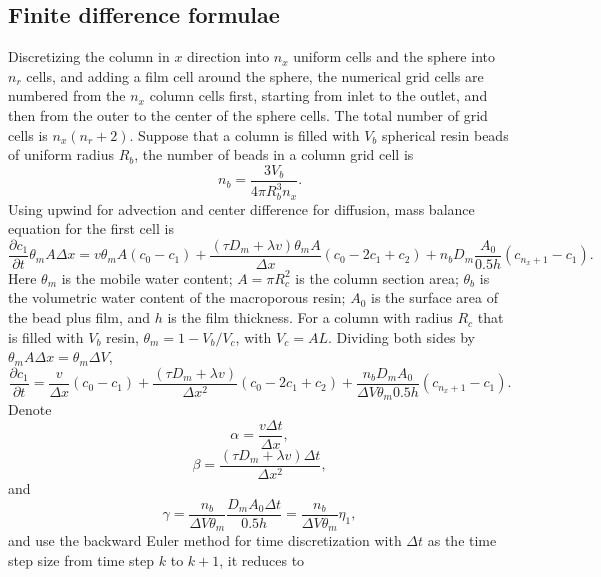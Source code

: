 \documentclass{article}
\begin{document}
\subsection{Finite difference formulae}
Discretizing the column in $x$ direction into $n_x$ uniform cells and the sphere into $n_r$  cells, and adding a film cell around the sphere, the numerical grid cells are numbered from the $n_x$ column cells first, starting from inlet to the outlet, and then from the outer to the center of the sphere cells. The total number of grid cells is $n_x(n_r + 2)$. Suppose that a column is filled with $V_b$ spherical resin beads of uniform radius $R_b$, the number of beads in a column grid cell is
\begin{equation}
n_b = \frac{3V_b}{4\pi R_b^3n_x} .
\end{equation}
Using upwind for advection and center difference for diffusion, mass balance equation for the first cell is
\begin{equation}
\frac{\partial c_1}{\partial t}\theta_m A \Delta x = v\theta_m A(c_0 - c_1) + \frac{(\tau D_m+\lambda v )\theta_m A}{\Delta x} \left(c_0 -2 c_1 + c_2\right) + n_b D_m \frac{A_0}{0.5h} (c_{n_x+1} - c_1).
\end{equation}
Here $\theta_m$ is the mobile water content; $A=\pi R_c^2$ is the column section area; $\theta_b$  is the volumetric water content of the macroporous resin; $A_0$ is the surface area of the bead plus film, and $h$ is the film thickness. For a column with radius $R_c$ that is filled with $V_b$ resin, $\theta_m = 1 - V_b/V_c$, with $V_c = AL$. Dividing both sides by $\theta_mA\Delta x = \theta_m \Delta V$, 
\begin{equation}
\frac{\partial c_1}{\partial t}= \frac{v}{\Delta x}(c_0 - c_1) + \frac{(\tau D_m+\lambda v )}{\Delta x^2} \left(c_0 -2 c_1 + c_2\right) + \frac{n_b D_m A_0}{\Delta V \theta_m 0.5h} (c_{n_x+1} - c_1).
\end{equation}
Denote 
\begin{equation}
\alpha = \frac{v \Delta t}{\Delta x},
\end{equation}
\begin{equation}
\beta = \frac{(\tau D_m + \lambda v) \Delta t}{\Delta x^2}, 
\end{equation}
and
\begin{equation}
\gamma = \frac{n_b}{\Delta V \theta_m}\frac{D_mA_0\Delta t}{0.5h} =  \frac{n_b}{\Delta V \theta_m}\eta_1,
\end{equation}
and use the backward Euler method for time discretization with $\Delta t$ as the time step size from time step $k$ to $k+1$, it reduces to
\end{document}
